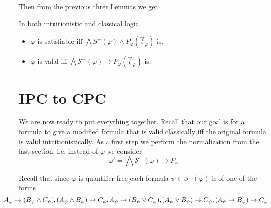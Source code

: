 \documentclass[a4paper,UKenglish,cleveref, autoref, thm-restate]{lipics-v2021}
\begin{document}
Then from the previous three Lemmas we get

\begin{corollary}\label{equivalid}
	In both intuitionistic and classical logic
	\begin{itemize}
		\item $\varphi$ is satisfiable iff $\mathcal \bigwedge S^+(\varphi)\wedge P_\varphi(\vec t_\varphi)$ is. 
		\item $\varphi$ is valid iff $\bigwedge\mathcal S^-(\varphi)\to P_\varphi(\vec t_\varphi)$ is.
	\end{itemize}
\end{corollary}

\section{IPC to CPC}

We are now ready to put everything together. Recall that our goal is for a formula to give a modified formula that is valid classically iff the original formula is valid intuitionistically. As a first step we perform the normalization from the last section, i.e. instead of $\varphi$ we consider $$\varphi' = \bigwedge \mathcal S^-(\varphi)\to P_\varphi$$

Recall that since $\varphi$ is quantifier-free each formula $\psi\in\mathcal S^-(\varphi)$ is of one of the forms
$$\hspace{-0.8cm}A_\psi\to (B_\psi\wedge C_\psi), (A_\psi\wedge B_\psi)\to C_\psi, A_\psi\to (B_\psi\vee C_\psi), (A_\psi\vee B_\psi)\to C_\psi, (A_\psi\to B_\psi)\to C_\psi$$
\end{document}
